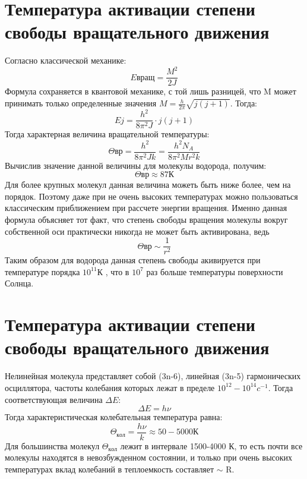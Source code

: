 \documentclass{article}
\begin{document}
\section{Температура активации степени свободы вращательного движения}
Согласно классической механике:
\begin{equation*}
E{вращ} = \frac{M^2}{2J}
\end{equation*}
Формула сохраняется в квантовой механике, с той лишь разницей, что M может принимать только определенные значения $M = \frac{h}{2\pi}\sqrt{j(j+1)}$. Тогда:
\begin{equation*}
E{j} = \frac{h^2}{8\pi^2J}\cdot j(j+1)
\end{equation*}
Тогда характерная величина вращательной температуры:
\begin{equation*}
\Theta{вр} = \frac{h^2}{8\pi^2Jk} =  \frac{h^2N_A}{8\pi^2Mr^2k}
\end{equation*}
Вычислив значение данной величины для молекулы водорода, получим:
\begin{equation*}
\Theta{вр} \approx 87 К
\end{equation*}
Для более крупных молекул данная величина можеть быть ниже более, чем на порядок. Поэтому даже при не очень высоких температурах можно пользоваться классическим приближением при рассчете энергии вращения.
Именно данная формула объясняет тот факт, что степень свободы вращения молекулы вокруг собственной оси практически никогда не может быть активирована, ведь 
\begin{equation*}
\Theta{вр}  \sim  \frac{1}{r^2}
\end{equation*}
Таким образом для водорода данная степень свободы акивируется при температуре порядка $10^{11} К$ , что в $10^{7}$ раз больше температуры поверхности Солнца.
\section{Температура активации степени свободы вращательного движения}
Нелинейная молекула представляет собой (3n-6), линейная (3n-5) гармонических осциллятора, частоты колебания которых лежат в пределе $10^{12}-10^{14} c^{-1}$. Тогда соответствующая величина $\Delta E$:
\begin{equation*}
\Delta E = h \nu
\end{equation*}
Тогда характеристическая колебательная температура равна:
\begin{equation*}
\Theta_{кол} = \frac{h \nu}{k} \approx 50-5000 К
\end{equation*}
Для большинства молекул $\Theta_{кол}$ лежит в интервале 1500-4000 К, то есть почти все молекулы находятся в невозбужденном состоянии, и только при очень высоких температурах вклад колебаний в теплоемкость составляет $\sim$ R.
\end{document}
